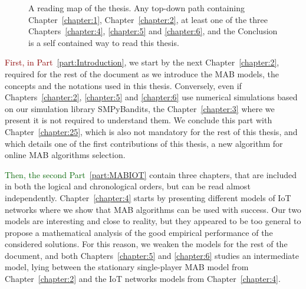 \begin{figure}[h!]
{
    }
    \caption[Organization of the thesis: a reading map]{A reading map of the thesis. Any top-down path containing Chapter~\ref{chapter:1}, Chapter~\ref{chapter:2}, at least one of the three Chapters~\ref{chapter:4}, \ref{chapter:5} and \ref{chapter:6}, and the Conclusion is a self contained way to read this thesis.}
    \label{fig:1:organization}
\end{figure}

\textcolor{darkred}{First, in Part~\ref{part:Introduction}}, we start by the next Chapter~\ref{chapter:2}, required for the rest of the document as we introduce the MAB models, the concepts and the notations used in this thesis.
Conversely, even if Chapters~\ref{chapter:2}, \ref{chapter:5} and \ref{chapter:6} use numerical simulations based on our simulation library SMPyBandits, the Chapter~\ref{chapter:3} where we present it is not required to understand them.
We conclude this part with Chapter~\ref{chapter:25}, which is also not mandatory for the rest of this thesis, and which details one of the first contributions of this thesis, a new algorithm for online MAB algorithms selection.

\textcolor{darkgreen}{Then, the second Part~\ref{part:MABIOT}} contain three chapters, that are included in both the logical and chronological orders, but can be read almost independently.
Chapter~\ref{chapter:4} starts by presenting different models of IoT networks where we show that MAB algorithms can be used with success. Our two models are interesting and close to reality, but they appeared to be too general to propose a mathematical analysis of the good empirical performance of the considered solutions.
For this reason, we weaken the models for the rest of the document,
and both Chapters~\ref{chapter:5} and \ref{chapter:6} studies an intermediate model, lying between the stationary single-player MAB model from Chapter~\ref{chapter:2} and the IoT networks models from Chapter~\ref{chapter:4}.


